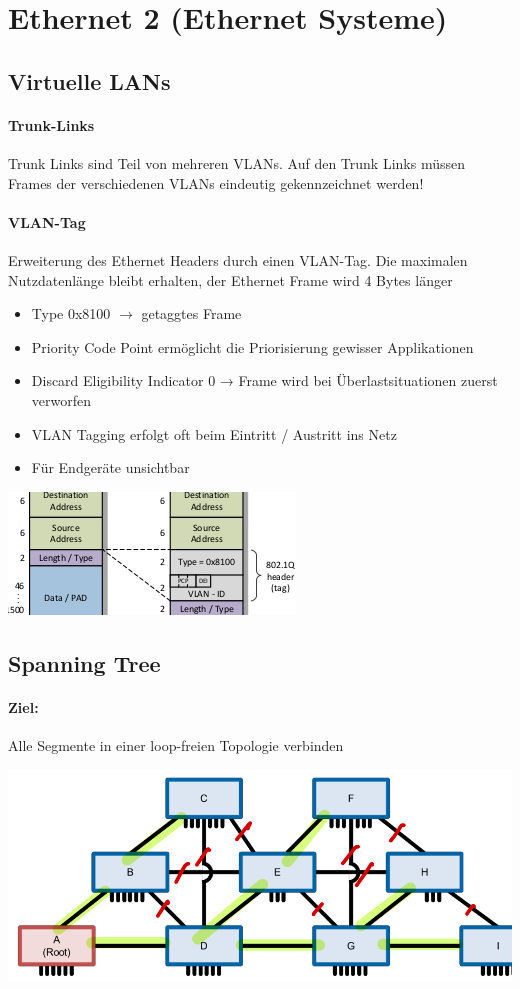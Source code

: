 
\section{Ethernet 2 (Ethernet Systeme)}

\subsection{Virtuelle LANs}

\paragraph{Trunk-Links} Trunk Links sind Teil von mehreren VLANs. Auf den Trunk Links müssen Frames der verschiedenen VLANs eindeutig gekennzeichnet werden!

\paragraph{VLAN-Tag} Erweiterung des Ethernet Headers durch einen
VLAN-Tag.
Die maximalen Nutzdatenlänge bleibt erhalten,
der Ethernet Frame wird 4 Bytes länger
{
\begin{itemize}[noitemsep]
    \item Type 0x8100 $\to$ getaggtes Frame
    \item Priority Code Point ermöglicht die Priorisierung gewisser Applikationen
    \item Discard Eligibility Indicator 0 → Frame wird bei Überlastsituationen zuerst verworfen
    \item VLAN Tagging erfolgt oft beim Eintritt / Austritt ins Netz
    \item  Für Endgeräte unsichtbar
\end{itemize}
\includegraphics[scale=.75]{img/vlan.png}
\WhiteSpace
}

\subsection{Spanning Tree}

{\paragraph{Ziel:}  Alle Segmente in einer loop-freien Topologie verbinden}
\includegraphics[scale=.275]{img/spanning_tree.png}

